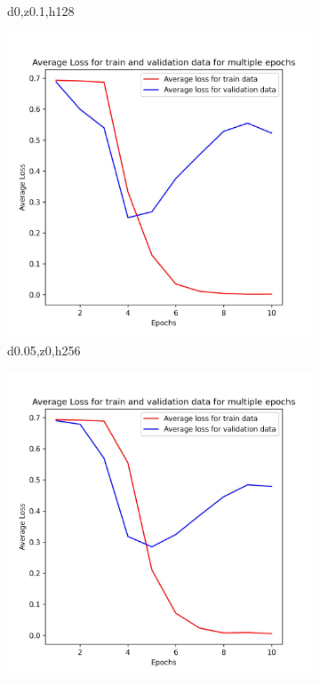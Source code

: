 \documentclass{article}
\begin{document}
\begin{figure}
\begin{subfigure}[b]{0.22\textwidth}
		\caption{d0,z0.1,h128}
	\end{subfigure}
	\begin{subfigure}[b]{0.22\textwidth}
		\centering
		\includegraphics[width=\textwidth]{d0.05_z0_h256_1D_1.jpg}
		\caption{d0.05,z0,h256}
	\end{subfigure}
	\begin{subfigure}[b]{0.22\textwidth}
		\centering
		\includegraphics[width=\textwidth]{d0.05_z0_h256_1D_2.jpg}

\end{subfigure}
\end{figure}
\end{document}
